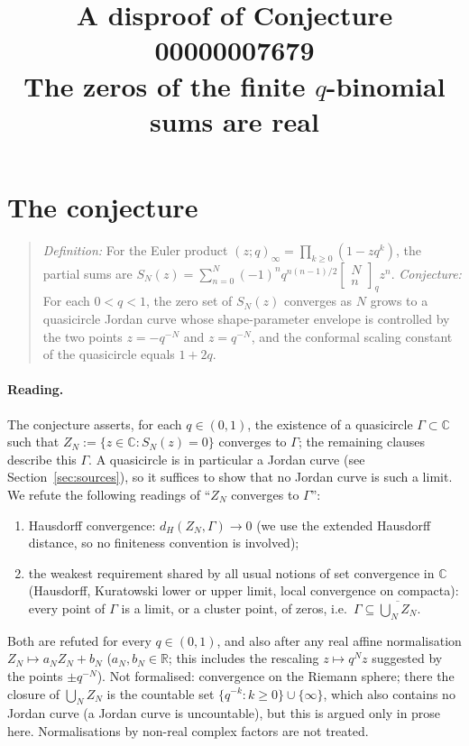 \documentclass[11pt]{article}
\title{A disproof of Conjecture 00000007679\\[2pt]
\large The zeros of the finite $q$-binomial sums are real}
\date{}
\renewcommand{\_}{\oldus\allowbreak}
\theoremstyle{definition}
\theoremstyle{remark}
\newcommand{\qbin}[3]{\begin{bmatrix}#1\\#2\end{bmatrix}_{#3}}
\begin{document}
\sloppy
\maketitle

\section{The conjecture}

\begin{quote}
\emph{Definition:} For the Euler product $(z;q)_\infty=\prod_{k\ge0}(1-zq^k)$, the partial sums are
$S_N(z)=\sum_{n=0}^{N}(-1)^n q^{n(n-1)/2}\qbin{N}{n}{q} z^n$.
\emph{Conjecture:} For each $0<q<1$, the zero set of $S_N(z)$ converges as $N$ grows to a quasicircle
Jordan curve whose shape-parameter envelope is controlled by the two points $z=-q^{-N}$ and
$z=q^{-N}$, and the conformal scaling constant of the quasicircle equals $1+2q$.
\end{quote}

\paragraph{Reading.} The conjecture asserts, for each $q\in(0,1)$, the existence of a quasicircle
$\Gamma\subset\mathbb{C}$ such that $Z_N:=\{z\in\mathbb{C}: S_N(z)=0\}$ converges to $\Gamma$; the
remaining clauses describe this $\Gamma$. A quasicircle is in particular a Jordan curve (see
Section~\ref{sec:sources}), so it suffices to show that no Jordan curve is such a limit. We refute
the following readings of ``$Z_N$ converges to $\Gamma$'':
\begin{enumerate}
\item[(H)] Hausdorff convergence: $d_H(Z_N,\Gamma)\to0$ (we use the extended Hausdorff distance,
  so no finiteness convention is involved);
\item[(W)] the weakest requirement shared by all usual notions of set convergence in $\mathbb{C}$
  (Hausdorff, Kuratowski lower or upper limit, local convergence on compacta): every point of $\Gamma$
  is a limit, or a cluster point, of zeros, i.e.\ $\Gamma\subseteq\overline{\bigcup_N Z_N}$.
\end{enumerate}
Both are refuted for every $q\in(0,1)$, and also after any real affine normalisation
$Z_N\mapsto a_NZ_N+b_N$ ($a_N,b_N\in\mathbb{R}$; this includes the rescaling $z\mapsto q^Nz$ suggested by
the points $\pm q^{-N}$). Not formalised: convergence on the Riemann sphere; there the closure of
$\bigcup_N Z_N$ is the countable set $\{q^{-k}:k\ge0\}\cup\{\infty\}$, which also contains no Jordan
curve (a Jordan curve is uncountable), but this is argued only in prose here. Normalisations by
non-real complex factors are not treated.
\end{document}
